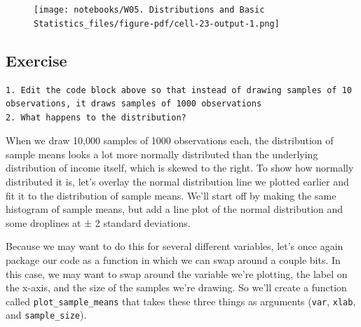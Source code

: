\documentclass[
  letterpaper,
  DIV=11,
  numbers=noendperiod]{scrreprt}
\begin{document}
\begin{figure}[H]

{\centering \texttt{[image: notebooks/W05. Distributions and Basic Statistics\_files/figure-pdf/cell-23-output-1.png]}

}

\end{figure}

\hypertarget{exercise-15}{%
\subsection{Exercise}\label{exercise-15}}

\begin{verbatim}
1. Edit the code block above so that instead of drawing samples of 10 observations, it draws samples of 1000 observations
2. What happens to the distribution?
\end{verbatim}

When we draw 10,000 samples of 1000 observations each, the distribution
of sample means looks a lot more normally distributed than the
underlying distribution of income itself, which is skewed to the right.
To show how normally distributed it is, let's overlay the normal
distribution line we plotted earlier and fit it to the distribution of
sample means. We'll start off by making the same histogram of sample
means, but add a line plot of the normal distribution and some droplines
at ± 2 standard deviations.

Because we may want to do this for several different variables, let's
once again package our code as a function in which we can swap around a
couple bits. In this case, we may want to swap around the variable we're
plotting, the label on the x-axis, and the size of the samples we're
drawing. So we'll create a function called \texttt{plot\_sample\_means}
that takes these three things as arguments (\texttt{var}, \texttt{xlab},
and \texttt{sample\_size}).
\end{document}
